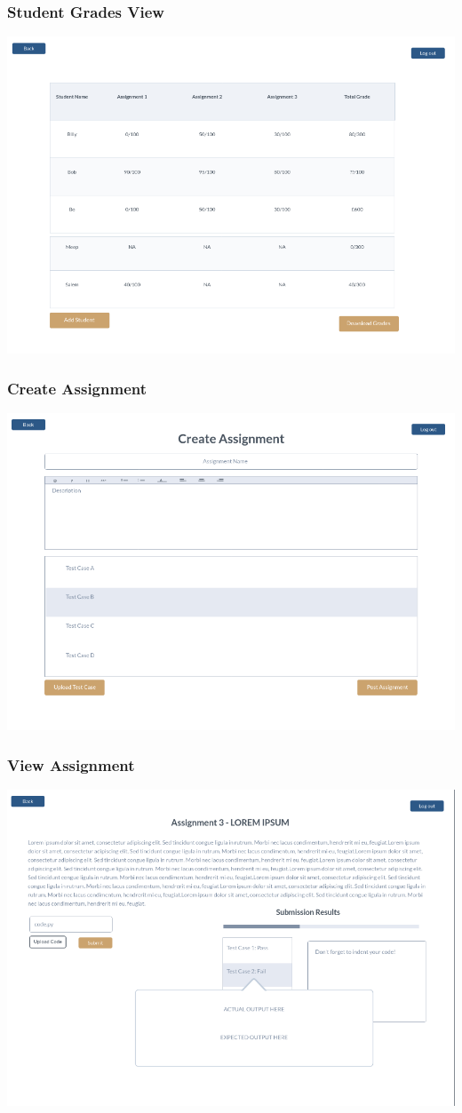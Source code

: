 \documentclass{article}
\begin{document}
\subsubsection{Student Grades View}
\includegraphics[width=0.8\linewidth]{CourseStudentList.png}

\subsubsection{Create Assignment}
\includegraphics[width=0.8\linewidth]{CreateAssignment.png}

\subsubsection{View Assignment}
\includegraphics[width=0.8\linewidth]{ViewAssignment.png}
\end{document}
